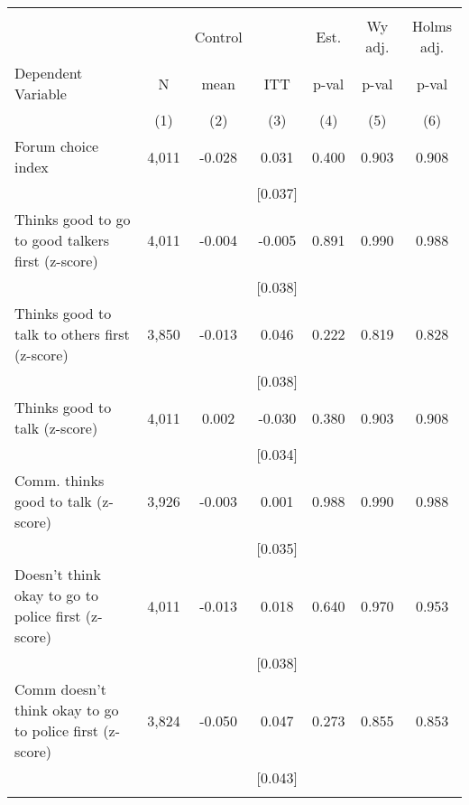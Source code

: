 \begin{tabular}{lcccccc}
\hline \noalign{\smallskip} &  &  &  &  &  & \\
 &  & Control &  & Est. & Wy adj. & Holms adj.\\
Dependent Variable & N & mean & ITT & p-val & p-val & p-val\\
 & (1) & (2) & (3) & (4) & (5) & (6)\\
\noalign{\smallskip}\hline \noalign{\smallskip}\quad Forum choice index & 4,011 & -0.028 & 0.031 & 0.400 & 0.903 & 0.908\\
 &  &  & [0.037] &  &  & \\
\quad Thinks good to go to good talkers first (z-score) & 4,011 & -0.004 & -0.005 & 0.891 & 0.990 & 0.988\\
 &  &  & [0.038] &  &  & \\
\quad Thinks good to talk to others first (z-score) & 3,850 & -0.013 & 0.046 & 0.222 & 0.819 & 0.828\\
 &  &  & [0.038] &  &  & \\
\quad Thinks good to talk (z-score) & 4,011 & 0.002 & -0.030 & 0.380 & 0.903 & 0.908\\
 &  &  & [0.034] &  &  & \\
\quad Comm. thinks good to talk (z-score) & 3,926 & -0.003 & 0.001 & 0.988 & 0.990 & 0.988\\
 &  &  & [0.035] &  &  & \\
\quad Doesn't think okay to go to police first (z-score) & 4,011 & -0.013 & 0.018 & 0.640 & 0.970 & 0.953\\
 &  &  & [0.038] &  &  & \\
\quad Comm doesn't think okay to go to police first (z-score) & 3,824 & -0.050 & 0.047 & 0.273 & 0.855 & 0.853\\
 &  &  & [0.043] &  &  & \\
\noalign{\smallskip}\hline\end{tabular}
